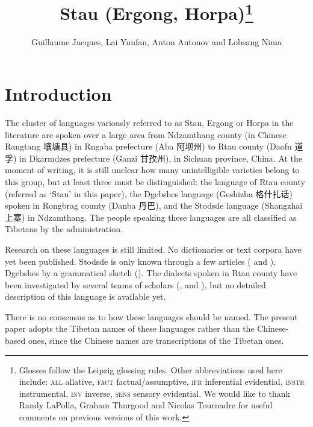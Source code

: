 \documentclass[oneside,a4paper,11pt]{article}
\newcommand{\zh}[1]{{\cn #1}}
\begin{document}
 


\title{Stau (Ergong, Horpa)\footnote{Glosses follow the Leipzig glossing rules. Other abbreviations used here include:   \textsc{all} allative, \textsc{fact} factual/assumptive, \textsc{ifr} inferential evidential, \textsc{instr} instrumental, \textsc{inv} inverse, \textsc{sens} sensory  evidential. We would like to thank Randy LaPolla, Graham Thurgood and Nicolas Tournadre for useful comments on previous versions of this work.}}
\author{Guillaume Jacques, Lai Yunfan, Anton Antonov and Lobsang Nima}

\maketitle
 

\section{Introduction}
The cluster of languages variously referred to as Stau, Ergong or Horpa in the literature are spoken over a large area from Ndzamthang county (in Chinese Rangtang  \zh{壤塘县})  in Rngaba  prefecture (Aba \zh{阿坝州}) to Rtau county (Daofu \zh{道孚}) in Dkarmdzes prefecture (Ganzi \zh{甘孜州}), in Sichuan province, China. At the moment of writing, it is still unclear how many unintelligible varieties belong to this group, but at least three must be distinguished: the language of Rtau county (referred as `Stau' in this paper), the Dgebshes language (Geshizha \zh{格什扎话})  spoken in Rongbrag county (Danba \zh{丹巴}), and the Stodsde language (Shangzhai \zh{上寨}) in Ndzamthang. The people speaking these languages are all classified as Tibetans by the administration.  

Research on these languages is still limited. No dictionaries or text corpora have yet been published. Stodsde is only known through a few articles (\citealt{jackson00sidaba} and   \citealt{jackson07shangzhai}), Dgebshes by a grammatical sketch (\citealt{duoerji98geshizha}). The dialects spoken in Rtau county have been investigated by several teams of scholars (\citealt{huangbf91daofu}, \citealt{sun13gexi} and \citealt{jacques14rtau}), but no detailed description of this language is available yet.

There is no consensus as to how these languages should be named. The present paper adopts the Tibetan names of these languages rather than the Chinese-based ones, since the Chinese names are transcriptions of the Tibetan ones. 
\end{document}
